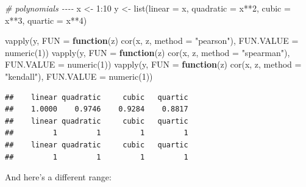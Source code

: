 \documentclass[
]{krantz}
\makeatletter
\newenvironment{Shaded}{\begin{snugshade}}{\end{snugshade}}
\newcommand{\AttributeTok}[1]{\textcolor[rgb]{0.61,0.61,0.61}{#1}}
\newcommand{\CommentTok}[1]{\textcolor[rgb]{0.37,0.37,0.37}{\textit{#1}}}
\newcommand{\ControlFlowTok}[1]{\textcolor[rgb]{0.27,0.27,0.27}{\textbf{#1}}}
\newcommand{\DecValTok}[1]{\textcolor[rgb]{0.06,0.06,0.06}{#1}}
\newcommand{\FunctionTok}[1]{\textcolor[rgb]{0,0,0}{#1}}
\newcommand{\NormalTok}[1]{#1}
\newcommand{\OtherTok}[1]{\textcolor[rgb]{0.37,0.37,0.37}{#1}}
\newcommand{\SpecialCharTok}[1]{\textcolor[rgb]{0,0,0}{#1}}
\newcommand{\StringTok}[1]{\textcolor[rgb]{0.5,0.5,0.5}{#1}}
\newenvironment{kframe}{%
\medskip{}
\setlength{\fboxsep}{.8em}
 \def\at@end@of@kframe{}%
 \ifinner\ifhmode%
  \def\at@end@of@kframe{\end{minipage}}%
  \begin{minipage}{\columnwidth}%
 \fi\fi%
 \def\FrameCommand##1{\hskip\@totalleftmargin \hskip-\fboxsep
 \colorbox{shadecolor}{##1}\hskip-\fboxsep
     \hskip-\linewidth \hskip-\@totalleftmargin \hskip\columnwidth}%
 \MakeFramed {\advance\hsize-\width
   \@totalleftmargin\z@ \linewidth\hsize
   \@setminipage}}%
 {\par\unskip\endMakeFramed%
 \at@end@of@kframe}
\renewenvironment{Shaded}{\begin{kframe}}{\end{kframe}}
\makeatother
\begin{document}
\begin{Shaded}
\begin{Highlighting}[]
\CommentTok{\# polynomials {-}{-}{-}{-}}
\NormalTok{x }\OtherTok{\textless{}{-}} \DecValTok{1}\SpecialCharTok{:}\DecValTok{10}
\NormalTok{y }\OtherTok{\textless{}{-}} \FunctionTok{list}\NormalTok{(}\AttributeTok{linear =}\NormalTok{ x, }\AttributeTok{quadratic =}\NormalTok{ x}\SpecialCharTok{**}\DecValTok{2}\NormalTok{, }\AttributeTok{cubic =}\NormalTok{ x}\SpecialCharTok{**}\DecValTok{3}\NormalTok{, }\AttributeTok{quartic =}\NormalTok{ x}\SpecialCharTok{**}\DecValTok{4}\NormalTok{)}

\FunctionTok{vapply}\NormalTok{(y, }\AttributeTok{FUN =} \ControlFlowTok{function}\NormalTok{(z) }\FunctionTok{cor}\NormalTok{(x, z, }\AttributeTok{method =} \StringTok{"pearson"}\NormalTok{), }\AttributeTok{FUN.VALUE =} \FunctionTok{numeric}\NormalTok{(}\DecValTok{1}\NormalTok{))}
\FunctionTok{vapply}\NormalTok{(y, }\AttributeTok{FUN =} \ControlFlowTok{function}\NormalTok{(z) }\FunctionTok{cor}\NormalTok{(x, z, }\AttributeTok{method =} \StringTok{"spearman"}\NormalTok{), }\AttributeTok{FUN.VALUE =} \FunctionTok{numeric}\NormalTok{(}\DecValTok{1}\NormalTok{))}
\FunctionTok{vapply}\NormalTok{(y, }\AttributeTok{FUN =} \ControlFlowTok{function}\NormalTok{(z) }\FunctionTok{cor}\NormalTok{(x, z, }\AttributeTok{method =} \StringTok{"kendall"}\NormalTok{), }\AttributeTok{FUN.VALUE =} \FunctionTok{numeric}\NormalTok{(}\DecValTok{1}\NormalTok{))}
\end{Highlighting}
\end{Shaded}

\begin{verbatim}
##    linear quadratic     cubic   quartic 
##    1.0000    0.9746    0.9284    0.8817 
##    linear quadratic     cubic   quartic 
##         1         1         1         1 
##    linear quadratic     cubic   quartic 
##         1         1         1         1
\end{verbatim}

And here's a different range:
\end{document}
